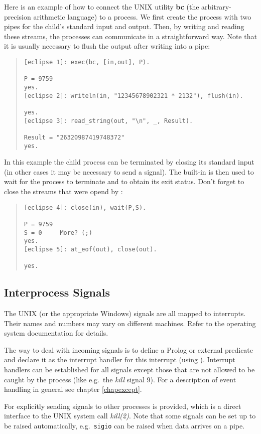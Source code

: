 Here is an example of how to connect the UNIX utility {\bf bc} (the
arbitrary-precision arithmetic language) to a {\eclipse} process.
We first create the process with two pipes for the child's standard input
and output.
Then, by writing and reading these streams, the processes can communicate in
a straightforward way. Note that it is usually necessary to flush the
output after writing into a pipe:
\begin{quote}\begin{verbatim}
[eclipse 1]: exec(bc, [in,out], P).

P = 9759
yes.
[eclipse 2]: writeln(in, "12345678902321 * 2132"), flush(in).

yes.
[eclipse 3]: read_string(out, "\n", _, Result).

Result = "26320987419748372"
yes.
\end{verbatim}\end{quote}
In this example the child process can be terminated by closing its standard
input (in other cases it may be necessary to send a signal).
The built-in  is then used to wait for the process to terminate
and to obtain its exit status.
Don't forget to close the {\eclipse} streams that were opend by :
\begin{quote}\begin{verbatim}
[eclipse 4]: close(in), wait(P,S).

P = 9759
S = 0     More? (;) 
yes.
[eclipse 5]: at_eof(out), close(out).

yes.
\end{verbatim}\end{quote}

\subsection{Interprocess Signals}
The UNIX (or the appropriate Windows) signals are all mapped to {\eclipse} interrupts.
Their names and numbers may vary on different machines.
Refer to the operating system documentation for details.

The way to deal with incoming signals is to define a Prolog or external
predicate and declare it as the interrupt handler for this interrupt
(using ).
Interrupt handlers can be established for all signals except those that are
not allowed to be caught by the process (like e.g.\ the {\it kill} signal 9).
For a description of event handling in general see chapter \ref{chapexcept}.

For explicitly sending signals to other processes  is provided,
which is a direct interface to the UNIX system call {\it kill(2)}.
Note that some signals can be set up to be raised automatically,
e.g.\ {\tt sigio} can be raised when data arrives on a pipe.


